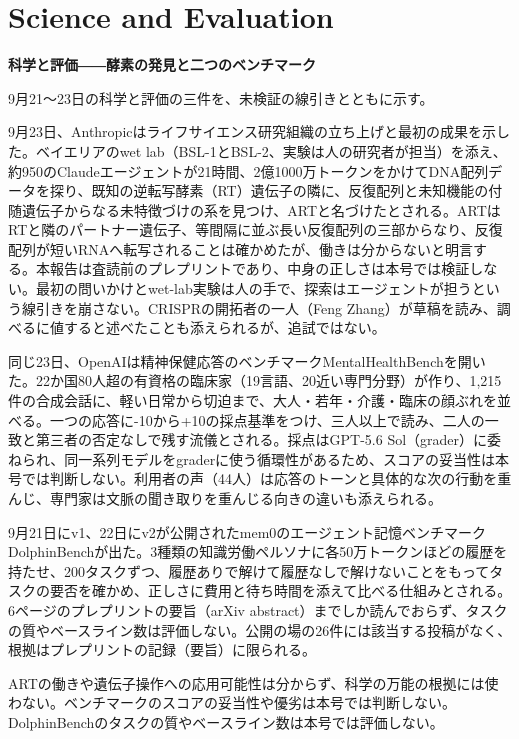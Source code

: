 \section{Science and Evaluation}
\begin{wideflow}
{\Large\bfseries 科学と評価――酵素の発見と二つのベンチマーク}\par
\smallskip
{\color{SurveyMuted}9月21～23日の科学と評価の三件を、未検証の線引きとともに示す。}\par
\end{wideflow}

9月23日、Anthropicはライフサイエンス研究組織の立ち上げと最初の成果を示した\cite{enzymeart}。ベイエリアのwet lab（BSL-1とBSL-2、実験は人の研究者が担当）を添え、約950のClaudeエージェントが21時間、2億1000万トークンをかけてDNA配列データを探り、既知の逆転写酵素（RT）遺伝子の隣に、反復配列と未知機能の付随遺伝子からなる未特徴づけの系を見つけ、ARTと名づけたとされる。ARTはRTと隣のパートナー遺伝子、等間隔に並ぶ長い反復配列の三部からなり、反復配列が短いRNAへ転写されることは確かめたが、働きは分からないと明言する。本報告は査読前のプレプリントであり、中身の正しさは本号では検証しない。最初の問いかけとwet-lab実験は人の手で、探索はエージェントが担うという線引きを崩さない。CRISPRの開拓者の一人（Feng Zhang）が草稿を読み、調べるに値すると述べたことも添えられるが、追試ではない。

同じ23日、OpenAIは精神保健応答のベンチマークMentalHealthBenchを開いた\cite{mhb}。22か国80人超の有資格の臨床家（19言語、20近い専門分野）が作り、1,215件の合成会話に、軽い日常から切迫まで、大人・若年・介護・臨床の顔ぶれを並べる。一つの応答に-10から+10の採点基準をつけ、三人以上で読み、二人の一致と第三者の否定なしで残す流儀とされる。採点はGPT-5.6 Sol（grader）に委ねられ、同一系列モデルをgraderに使う循環性があるため、スコアの妥当性は本号では判断しない。利用者の声（44人）は応答のトーンと具体的な次の行動を重んじ、専門家は文脈の聞き取りを重んじる向きの違いも添えられる。

9月21日にv1、22日にv2が公開されたmem0のエージェント記憶ベンチマークDolphinBenchが出た\cite{dolphin}。3種類の知識労働ペルソナに各50万トークンほどの履歴を持たせ、200タスクずつ、履歴ありで解けて履歴なしで解けないことをもってタスクの要否を確かめ、正しさに費用と待ち時間を添えて比べる仕組みとされる。6ページのプレプリントの要旨（arXiv abstract）までしか読んでおらず、タスクの質やベースライン数は評価しない。公開の場の26件には該当する投稿がなく、根拠はプレプリントの記録（要旨）に限られる。

\begin{claimboundary}[資料と評価の境界]
ARTの働きや遺伝子操作への応用可能性は分からず、科学の万能の根拠には使わない。ベンチマークのスコアの妥当性や優劣は本号では判断しない。DolphinBenchのタスクの質やベースライン数は本号では評価しない。
\end{claimboundary}

